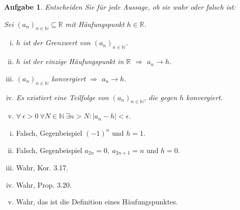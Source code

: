 \documentclass[a4paper, 20]{exam}
\newtheorem{ex}{Aufgabe}
\newcommand\RR{\mathbb{R}}
\newcommand\NN{\mathbb{N}}
\begin{document}
\begin{ex}
Entscheiden Sie f\"ur jede Aussage, ob sie wahr oder falsch ist:

Sei $(a_n)_{n\in \NN}\subseteq \RR$ mit H\"aufungspunkt $h\in \RR$.

\begin{enumerate}[i.)]
\item
$h$ ist der Grenzwert von $(a_n)_{n\in \NN}$.

\item
$h$ ist der einzige H\"aufungspunkt in $\RR$ $\Longrightarrow$ $a_n \longrightarrow h$.

\item
$(a_n)_{n\in \NN}$ konvergiert $\Longrightarrow$ $a_n \longrightarrow h$.

\item
Es existiert eine Teilfolge von $(a_n)_{n\in \NN}$, die gegen $h$ konvergiert.

\item
$\forall \ \epsilon >0 \ \forall N\in \NN \ \exists n>N: \vert a_n - h\vert < \epsilon$.
\end{enumerate}
\end{ex}
\begin{solution}
\begin{enumerate}[i.)]
\item
Falsch, Gegenbeispiel $(-1)^n$ und $h=1$.
\item
Falsch, Gegenbeispiel $a_{2n}=0, \ a_{2n+1}=n$ und $h=0$.
\item
Wahr, Kor. 3.17.
\item
Wahr, Prop. 3.20.
\item
Wahr, das ist die Definition eines H\"aufungspunktes.
\end{enumerate}
\end{solution}
\end{document}
